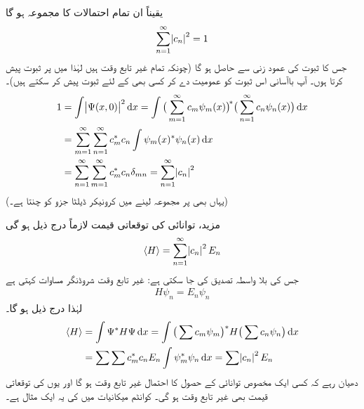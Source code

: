 یقیناً ان تمام احتمالات کا مجموعہ  ہو گا
\begin{align}
\sum_{n=1}^{\infty}\abs{c_n}^2=1
\end{align}
جس کا ثبوت  کی عمود زنی سے حاصل ہو گا (چونکہ تمام  غیر تابع وقت ہیں لہٰذا میں  پر ثبوت پیش کرتا ہوں۔ آپ باآسانی اس ثبوت کو عمومیت دے کر کسی بھی  کے لئے ثبوت پیش کر سکتے ہیں)۔
\begin{align*}
1&=\int\abs{\Psi(x,0)}^2\dif x=\int \big(\sum_{m=1}^{\infty}c_m\psi_m(x)\big)^{\!*}\big(\sum_{n=1}^{\infty}c_n\psi_n(x)\big)\dif x\\
&=\sum_{m=1}^{\infty}\sum_{n=1}^{\infty}c_m^*c_n\int\psi_m(x)^*\psi_n(x)\dif x\\
&=\sum_{n=1}^{\infty}\sum_{m=1}^{\infty}c_m^*c_n\delta_{mn}=\sum_{n=1}^{\infty}\abs{c_n}^2
\end{align*}
(یہاں بھی  پر مجموعہ لینے میں کرونیکر ڈیلٹا جزو  کو چنتا ہے۔)

مزید، توانائی کی توقعاتی قیمت لازماً درج ذیل ہو گی  
\begin{align}
\langle H\rangle=\sum_{n=1}^{\infty} \abs{c_n}^2 E_n
\end{align} 
 جس کی بلا واسطہ تصدیق کی جا سکتی ہے: غیر تابع وقت شروڈنگر مساوات کہتی ہے
\begin{align}
H\psi_n=E_n\psi_n
\end{align}
لہٰذا درج ذیل ہو گا۔
\begin{align*}
\langle H \rangle &=\int \Psi^*H\Psi\dif x=\int \big(\sum c_m\psi_m\big)^* H\big(\sum c_n\psi_n\big)\dif x\\
&=\sum\sum c_m^*c_nE_n\int \psi_m^*\psi_n\dif x=\sum\abs{c_n}^2 E_n
\end{align*}
دھیان رہے کہ کسی ایک مخصوص توانائی کے حصول  کا احتمال غیر تابع وقت ہو گا اور یوں  کی توقعاتی قیمت بھی غیر تابع وقت ہو گی۔ کوانٹم میکانیات میں   کی یہ ایک مثال ہے۔

